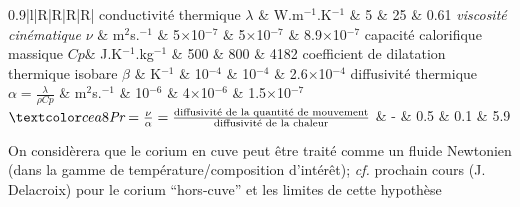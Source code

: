 \begin{frame}[fragile]
\begin{tiny}
\begin{center}
\begin{tabularx}{0.9\textwidth}{|l|R|R|R|R|}
  conductivité thermique $\lambda$ & W.m$^{-1}$.K$^{-1}$ & 5 & 25 & 0.61\n
  \emph{viscosité cinématique} $\nu$ & m$^2$s.$^{-1}$ & 5$\times$10$^{-7}$ & 5$\times$10$^{-7}$ & 8.9$\times$10$^{-7}$ \n
  capacité calorifique massique $Cp$& J.K$^{-1}$.kg$^{-1}$ & 500 & 800 & 4182 \n
  coefficient de dilatation thermique isobare $\beta$ & K$^{-1}$ & 10$^{-4}$ & 10$^{-4}$ & 2.6$\times$10$^{-4}$\n \hline
  diffusivité thermique $\alpha=\frac{\lambda}{\rho Cp}$ & m$^2$s.$^{-1}$ & 10$^{-6}$ & 4$\times$10$^{-6}$ & 1.5$\times$10$^{-7}$ \n
  $\emph{Pr}=\frac{\nu}{\alpha}=\frac{\text{diffusivité de la quantité de mouvement}}{\text{diffusivité de la chaleur}}$ & - & 0.5 & 0.1 & 5.9 \n \hline
  \end{tabularx}
\end{center}
  \begin{remark}
  On considèrera que le corium en cuve peut être traité comme un fluide Newtonien (dans la gamme de température/composition d'intérêt); \textit{cf.} prochain cours (J. Delacroix) pour le corium ``hors-cuve'' et les limites de cette hypothèse
  \end{remark}
\end{tiny} 
\end{frame}

